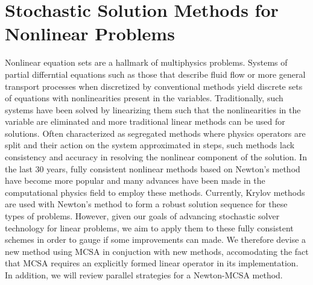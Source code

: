 \chapter{Stochastic Solution Methods for Nonlinear Problems}
\label{ch:nonlinear_problem}
Nonlinear equation sets are a hallmark of multiphysics
problems. Systems of partial differntial equations such as those that
describe fluid flow or more general transport processes when
discretized by conventional methods yield discrete sets of equations
with nonlinearities present in the variables. Traditionally, such
systems have been solved by linearizing them such that the
nonlinearities in the variable are eliminated and more traditional
linear methods can be used for solutions. Often characterized as
segregated methods where physics operators are split and their action
on the system approximated in steps, such methods lack consistency and
accuracy in resolving the nonlinear component of the solution. In the
last 30 years, fully consistent nonlinear methods based on Newton's
method have become more popular and many advances have been made in
the computational physics field to employ these methods. Currently,
Krylov methods are used with Newton's method to form a robust solution
sequence for these types of problems. However, given our goals of
advancing stochastic solver technology for linear problems, we aim to
apply them to these fully consistent schemes in order to gauge if some
improvements can made. We therefore devise a new method using MCSA in
conjuction with new methods, accomodating the fact that MCSA requires
an explicitly formed linear operator in its implementation. In
addition, we will review parallel strategies for a Newton-MCSA method.

